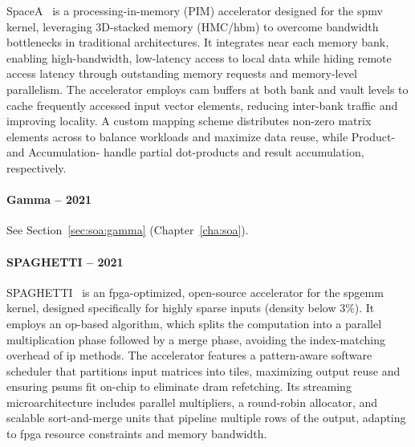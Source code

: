 SpaceA~\cite{Xie2021_SpaceA} is a processing-in-memory (PIM) accelerator designed for the \acrshort{spmv} kernel, leveraging 3D-stacked memory (\eg HMC/\acrshort{hbm}) to overcome bandwidth bottlenecks in traditional architectures.
It integrates  near each memory bank, enabling high-bandwidth, low-latency access to local data while hiding remote access latency through outstanding memory requests and memory-level parallelism.
The accelerator employs \acrfull{cam} buffers at both bank and vault levels to cache frequently accessed input vector elements, reducing inter-bank traffic and improving locality.
A custom mapping scheme distributes non-zero matrix elements across  to balance workloads and maximize data reuse, while Product- and Accumulation- handle partial dot-products and result accumulation, respectively.

\paragraph{Gamma -- 2021}

See Section~\ref{sec:soa:gamma} (Chapter~\ref{cha:soa}).

\paragraph{SPAGHETTI -- 2021}

SPAGHETTI~\cite{Hojabr2021_SPAGHETTI} is an \acrshort{fpga}-optimized, open-source accelerator for the \acrshort{spgemm} kernel, designed specifically for highly sparse inputs (density below 3\%).
It employs an \acrlong{op}-based algorithm, which splits the computation into a parallel multiplication phase followed by a merge phase, avoiding the index-matching overhead of \acrlong{ip} methods.
The accelerator features a pattern-aware software scheduler that partitions input matrices into \glspl{tile}, maximizing output reuse and ensuring \glspl{psum} fit on-chip to eliminate \acrshort{dram} refetching.
Its streaming microarchitecture includes parallel multipliers, a round-robin allocator, and scalable sort-and-merge units that pipeline multiple rows of the output, adapting to \acrshort{fpga} resource constraints and memory bandwidth.

